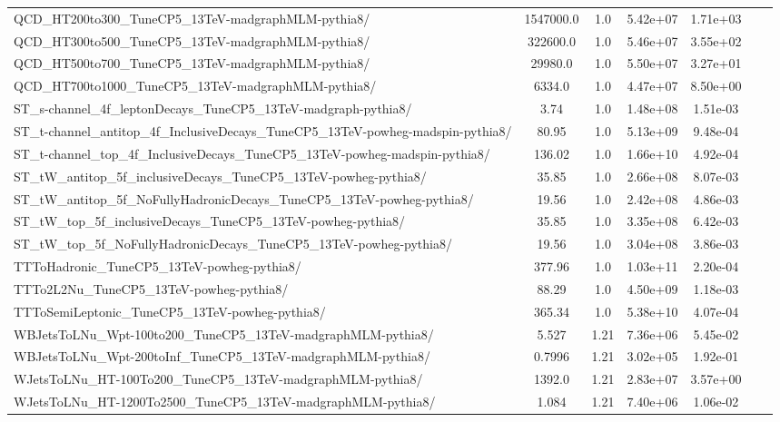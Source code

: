 \begin{table}
\begin{center}
{\begin{tabular}{|l|c|c|c|c|c|c|}
QCD\_HT200to300\_TuneCP5\_13TeV-madgraphMLM-pythia8/ & 1547000.0 & 1.0 & 5.42e+07 & {\color{red}1.71e+03} \\
QCD\_HT300to500\_TuneCP5\_13TeV-madgraphMLM-pythia8/ & 322600.0 & 1.0 & 5.46e+07 & {\color{red}3.55e+02} \\
QCD\_HT500to700\_TuneCP5\_13TeV-madgraphMLM-pythia8/ & 29980.0 & 1.0 & 5.50e+07 & {\color{red}3.27e+01} \\
QCD\_HT700to1000\_TuneCP5\_13TeV-madgraphMLM-pythia8/ & 6334.0 & 1.0 & 4.47e+07 & {\color{red}8.50e+00} \\
ST\_s-channel\_4f\_leptonDecays\_TuneCP5\_13TeV-madgraph-pythia8/ & 3.74 & 1.0 & 1.48e+08 & 1.51e-03 \\
ST\_t-channel\_antitop\_4f\_InclusiveDecays\_TuneCP5\_13TeV-powheg-madspin-pythia8/ & 80.95 & 1.0 & 5.13e+09 & 9.48e-04 \\
ST\_t-channel\_top\_4f\_InclusiveDecays\_TuneCP5\_13TeV-powheg-madspin-pythia8/ & 136.02 & 1.0 & 1.66e+10 & 4.92e-04 \\
ST\_tW\_antitop\_5f\_inclusiveDecays\_TuneCP5\_13TeV-powheg-pythia8/ & 35.85 & 1.0 & 2.66e+08 & 8.07e-03 \\
ST\_tW\_antitop\_5f\_NoFullyHadronicDecays\_TuneCP5\_13TeV-powheg-pythia8/ & 19.56 & 1.0 & 2.42e+08 & 4.86e-03 \\
ST\_tW\_top\_5f\_inclusiveDecays\_TuneCP5\_13TeV-powheg-pythia8/ & 35.85 & 1.0 & 3.35e+08 & 6.42e-03 \\
ST\_tW\_top\_5f\_NoFullyHadronicDecays\_TuneCP5\_13TeV-powheg-pythia8/ & 19.56 & 1.0 & 3.04e+08 & 3.86e-03 \\
TTToHadronic\_TuneCP5\_13TeV-powheg-pythia8/ & 377.96 & 1.0 & 1.03e+11 & 2.20e-04 \\
TTTo2L2Nu\_TuneCP5\_13TeV-powheg-pythia8/ & 88.29 & 1.0 & 4.50e+09 & 1.18e-03 \\
TTToSemiLeptonic\_TuneCP5\_13TeV-powheg-pythia8/ & 365.34 & 1.0 & 5.38e+10 & 4.07e-04 \\
WBJetsToLNu\_Wpt-100to200\_TuneCP5\_13TeV-madgraphMLM-pythia8/ & 5.527 & 1.21 & 7.36e+06 & 5.45e-02 \\
WBJetsToLNu\_Wpt-200toInf\_TuneCP5\_13TeV-madgraphMLM-pythia8/ & 0.7996 & 1.21 & 3.02e+05 & 1.92e-01 \\
WJetsToLNu\_HT-100To200\_TuneCP5\_13TeV-madgraphMLM-pythia8/ & 1392.0 & 1.21 & 2.83e+07 & {\color{red}3.57e+00} \\
WJetsToLNu\_HT-1200To2500\_TuneCP5\_13TeV-madgraphMLM-pythia8/ & 1.084 & 1.21 & 7.40e+06 & 1.06e-02 \\

\end{tabular}}
\end{center}
\end{table}
